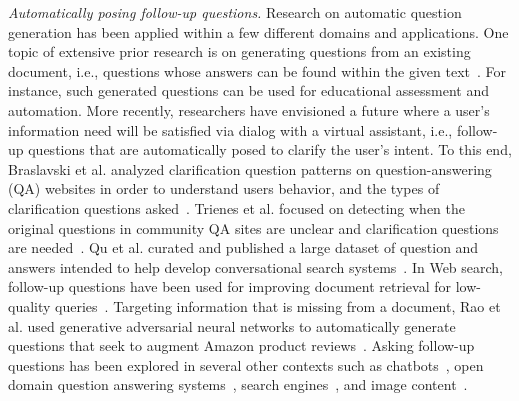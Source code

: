 \noindent
{\em Automatically posing follow-up questions.} Research on automatic question generation has been applied within a few different domains and applications. One topic of extensive prior research is on generating questions from an existing document, i.e., questions whose answers can be found within the given text~\cite{vanderwende2008importance,rus2011question,zhou2017neural,heilman2010good,duan2017question,du2017learning}. For instance, such generated questions can be used for educational assessment and automation. More recently, researchers have envisioned a future where a user's information need will be satisfied via dialog with a virtual assistant, i.e., follow-up questions that are automatically posed to clarify the user's intent. To this end, Braslavski et al. analyzed clarification question patterns on question-answering (QA) websites in order to understand users behavior, and the types of clarification questions asked~\cite{10.1145/3020165.3022149}. Trienes et al. focused on detecting when the original questions in community QA sites are unclear and clarification questions are needed~\cite{trienes2019identifying}. Qu et al. curated and published a large dataset of question and answers intended to help develop conversational search systems~\cite{10.1145/3209978.3210124}. In Web search, follow-up questions have been used for improving document retrieval for low-quality queries~\cite{10.1145/3366423.3380126,10.1145/3331184.3331265,stoyanchev2014towards}. Targeting information that is missing from a document, Rao et al. used generative adversarial neural networks to automatically generate questions that seek to augment Amazon product reviews~\cite{rao-daume-iii-2018-learning}. Asking follow-up questions has been explored in several other contexts such as chatbots~\cite{Hancock2019LearningFD}, open domain question answering systems~\cite{de2005implementing, de2003analysis}, search engines~\cite{Ren2020ConversationsWS}, and image content~\cite{Mostafazadeh_2016}.

